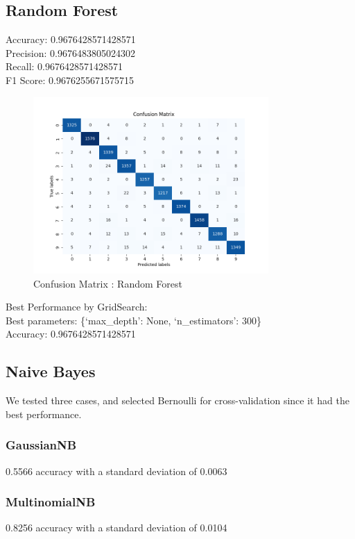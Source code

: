 \documentclass{assignmeownt}
\begin{document}
\subsection{Random Forest}
Accuracy: 0.9676428571428571 \\
Precision: 0.9676483805024302 \\
Recall: 0.9676428571428571 \\
F1 Score: 0.9676255671575715 \\
\begin{figure}[H]
    \centering
    \includegraphics[width=0.8\textwidth]{images/rfcConMat.png}
    \caption{Confusion Matrix : Random Forest}
    \label{fig:2}
\end{figure}

Best Performance by GridSearch:\\
Best parameters: \{`max\_depth': None, `n\_estimators': 300\}\\
Accuracy: 0.9676428571428571\\


\subsection{Naive Bayes}
We tested three cases, and selected Bernoulli for cross-validation since it had the best performance.
\subsubsection*{GaussianNB}
0.5566 accuracy with a standard deviation of 0.0063

\subsubsection*{MultinomialNB}
0.8256 accuracy with a standard deviation of 0.0104
\clearpage
\end{document}
